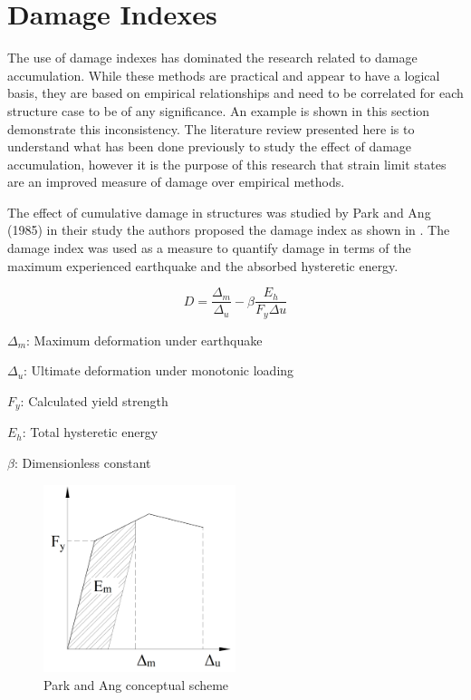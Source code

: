 \newpage

\section{Damage Indexes}
The use of damage indexes has dominated the research related to damage accumulation. While these methods are practical and appear to have a logical basis, they are based on empirical relationships and need to be correlated for each structure case to be of any significance. An example is shown in this section demonstrate this inconsistency.  The literature review presented here is to understand what has been done previously to study the effect of damage accumulation, however it is the purpose of this research that strain limit states are an improved measure of damage over empirical methods.

The effect of cumulative damage in structures was studied by Park and Ang (1985) \cite{Young-JiPark1985} in their study the authors proposed the damage index as shown in . The damage index was used as a measure to quantify damage in terms of the maximum experienced earthquake and the absorbed hysteretic energy.

\begin{equation}
  D=\frac{\Delta_{m}}{\Delta_{u}}-\beta \frac{E_h}{F_{y}\Delta{u}}
  \label{eq.DamageIndex}
\end{equation} 

$\Delta_{m}$: Maximum deformation under earthquake

$\Delta_{u}$: Ultimate deformation under monotonic loading

$F_{y}$: Calculated yield strength

$E_{h}$: Total hysteretic energy

$\beta$: Dimensionless constant 

\begin{figure}[htbp]
\centering
\includegraphics[width=0.50\textwidth]{Chapter-2/figs/Park_and_Ang_Model}
\caption{Park and Ang conceptual scheme}
\label{fig:Paa}
\end{figure}


